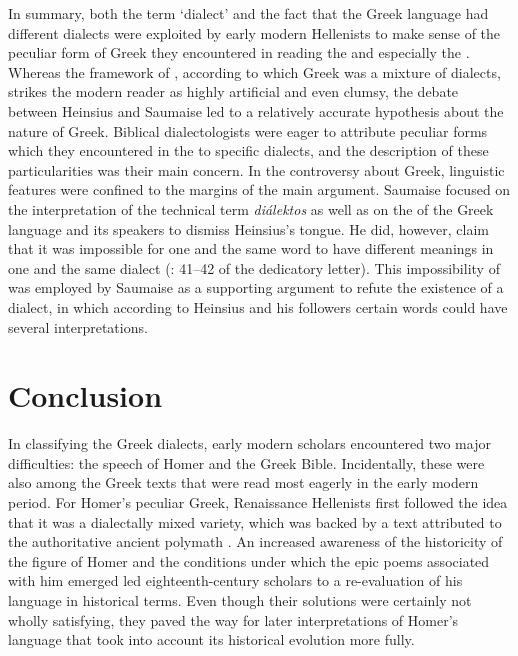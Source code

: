 In summary, both the term ‘dialect’ and the fact that the Greek language had different dialects were exploited by early modern Hellenists to make sense of the peculiar form of Greek they encountered in reading the  and especially the . Whereas the framework of , according to which  Greek was a mixture of dialects, strikes the modern reader as highly artificial and even clumsy, the debate between Heinsius and Saumaise led to a relatively accurate hypothesis about the nature of  Greek. Biblical dialectologists were eager to attribute peculiar forms which they encountered in the  to specific dialects, and the description of these particularities was their main concern. In the controversy about  Greek, linguistic features were confined to the margins of the main argument. Saumaise focused on the interpretation of the technical term \textit{diálektos} as well as on the  of the Greek language and its speakers to dismiss Heinsius’s  tongue. He did, however, claim that it was impossible for one and the same word to have different meanings in one and the same dialect (\citealt{Saumaise1643a}: 41–42 of the dedicatory letter). This impossibility of  was employed by Saumaise as a supporting argument to refute the existence of a  dialect, in which according to Heinsius and his followers certain words could have several interpretations.

\section{Conclusion}\label{sec:4.7}

In classifying the Greek dialects, early modern scholars encountered two major difficulties: the speech of Homer and the Greek Bible. Incidentally, these were also among the Greek texts that were read most eagerly in the early modern period. For Homer’s peculiar Greek, Renaissance Hellenists first followed the idea that it was a dialectally mixed variety, which was backed by a text attributed to the authoritative ancient polymath . An increased awareness of the historicity of the figure of Homer and the conditions under which the epic poems associated with him emerged led eighteenth-century scholars to a re-evaluation of his language in historical terms. Even though their solutions were certainly not wholly satisfying, they paved the way for later interpretations of Homer’s language that took into account its historical evolution more fully.

